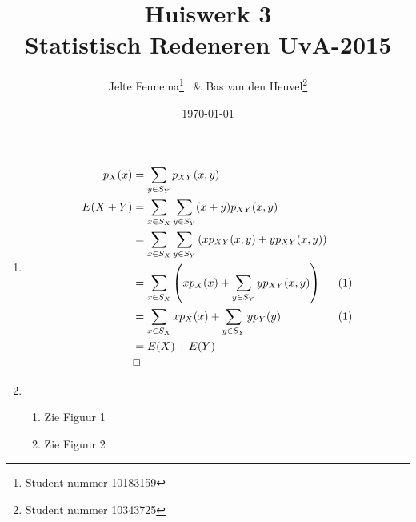 \documentclass{article}
\title{Huiswerk 3\\ \large{Statistisch Redeneren UvA-2015}}
\author{Jelte Fennema\thanks{Student nummer 10183159} ~\& Bas van den
Heuvel\thanks{Student nummer 10343725}}
\date{\today}
\begin{document}
\maketitle

\begin{enumerate}
    \item
        \begin{align}
            p_X(x) &= \sum_{y \in S_Y} p_{XY}(x, y) \\
            E(X+Y) &= \sum_{x \in S_X} \sum_{y \in S_Y} (x+y)p_{XY}(x,y) \notag \\
                   &= \sum_{x \in S_X} \sum_{y \in S_Y} \left(xp_{XY}(x, y)
            +yp_{XY}(x, y) \right) \notag \\
                   &= \sum_{x \in S_X} \left(xp_X(x) + \sum_{y \in S_Y}
            yp_{XY}(x,y)\right)
            & (1) \notag \\
                   &= \sum_{x \in S_X} xp_X(x) + \sum_{y \in S_Y} yp_Y(y) & (1)
            \notag \\
                   &= E(X) + E(Y) \notag \\
                   & \Box \notag
        \end{align}

    \item
        \begin{enumerate}[1.]
            \item Zie Figuur 1
                



            \item  Zie Figuur 2
                


\end{enumerate}
\end{enumerate}
\end{document}

